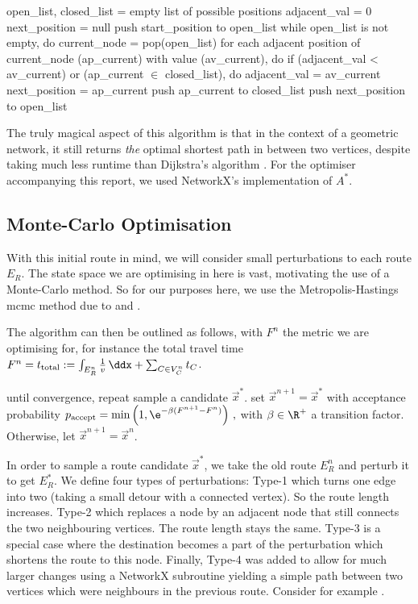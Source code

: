 \documentclass{prettytex/ox/mmsc-special-topic}
\begin{document}
  \begin{algorithm}[language=pseudo,basicstyle=\footnotesize,caption={\centering The $A^*$-search algorithm \parencite{astar}}]
open_list, closed_list = empty list of possible positions
adjacent_val = 0
next_position = null
push start_position to open_list
while open_list is not empty, do
  current_node = pop(open_list)
  for each adjacent position of current_node (ap_current)
        with value (av_current), do
    if (adjacent_val < av_current) or (ap_current $\in$ closed_list), do
      adjacent_val = av_current
      next_position = ap_current
    push ap_current to closed_list
  push next_position to open_list
  \end{algorithm}

  The truly magical aspect of this algorithm is that in the context of a geometric network, it still returns \textit{the} optimal shortest path in between two vertices, despite taking much less runtime than Dijkstra's algorithm \parencite{astar}.
  For the optimiser accompanying this report, we used NetworkX's implementation of $A^*$.

  \subsection{Monte-Carlo Optimisation}
  With this initial route in mind, we will consider small perturbations to each route $E_R$.
  The state space we are optimising in here is vast, motivating the use of a Monte-Carlo method.
  So for our purposes here, we use the Metropolis-Hastings \gls{mcmc} method due to \cite{metropolis} and \cite{hastings}.

  The algorithm can then be outlined as follows, with $F^{n}$ the metric we are optimising for, for instance the total travel time $F^n = t_{\rm total} := \int_{E_R^n} \frac{1}{v} \,\ddx + \sum_{C \in V_C^n} t_C$.
  \begin{algorithm}[language=pseudo,caption={\centering The Metropolis-Hastings algorithm \parencite{metropolis, hastings}},basicstyle=\footnotesize]
until convergence, repeat
  sample a candidate $\vec{x}^*$.
  set $\vec{x}^{n+1} = \vec{x}^*$ with acceptance probability
    $p_{\rm accept} = \min\left(1, \e^{-\beta (F^{n+1} - F^n)}\right)\,,$ with $\beta \in \R^+$ a transition factor.
  Otherwise, let $\vec{x}^{n+1} = \vec{x}^{n}$.
  \end{algorithm}

  In order to sample a route candidate $\vec{x}^*$, we take the old route $E_R^n$ and perturb it to get $E_R^*$.
  We define four types of perturbations: Type-1 which turns one edge into two (taking a small detour with a connected vertex). So the route length increases.
  Type-2 which replaces a node by an adjacent node that still connects the two neighbouring vertices. The route length stays the same.
  Type-3 is a special case where the destination becomes a part of the perturbation which shortens the route to this node.
  Finally, Type-4 was added to allow for much larger changes using a NetworkX subroutine yielding a simple path between two vertices which were neighbours in the previous route. Consider for example .
\end{document}
